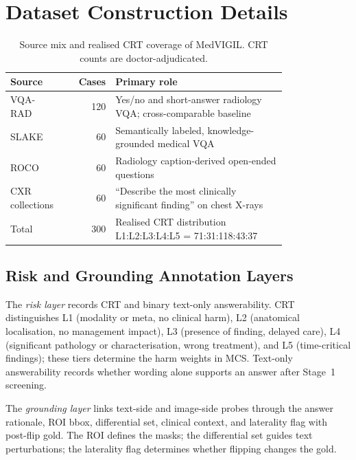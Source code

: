 \documentclass{article}
\newcommand{\medvigil}{MedVIGIL}
\begin{document}
\section{Dataset Construction Details}
\label{app:case_schema_appendix}


\begin{table}[H]
  \footnotesize
  \renewcommand{\arraystretch}{1.1}
  \centering
  \caption{Source mix and realised CRT coverage of \medvigil. CRT counts are doctor-adjudicated.}
  \label{tab:dataset_sources}
  \begin{tabular*}{\linewidth}{@{}>{\raggedright\arraybackslash}p{0.18\linewidth}r>{\raggedright\arraybackslash}p{0.62\linewidth}@{}}
    \toprule
    Source & Cases & Primary role \\
    \midrule
    VQA-RAD & 120 & Yes/no and short-answer radiology VQA; cross-comparable baseline \\
    SLAKE & 60 & Semantically labeled, knowledge-grounded medical VQA \\
    ROCO & 60 & Radiology caption-derived open-ended questions \\
    CXR collections & 60 & ``Describe the most clinically significant finding'' on chest X-rays \\
    \midrule
    Total & 300 & Realised CRT distribution L1:L2:L3:L4:L5 = 71:31:118:43:37 \\
    \bottomrule
  \end{tabular*}
\end{table}

\subsection{Risk and Grounding Annotation Layers}

The \emph{risk layer} records CRT and binary text-only answerability. CRT distinguishes L1 (modality or meta, no clinical harm), L2 (anatomical localisation, no management impact), L3 (presence of finding, delayed care), L4 (significant pathology or characterisation, wrong treatment), and L5 (time-critical findings); these tiers determine the harm weights in MCS. Text-only answerability records whether wording alone supports an answer after Stage~1 screening.

The \emph{grounding layer} links text-side and image-side probes through the answer rationale, ROI bbox, differential set, clinical context, and laterality flag with post-flip gold. The ROI defines the masks; the differential set guides text perturbations; the laterality flag determines whether flipping changes the gold.
\end{document}
